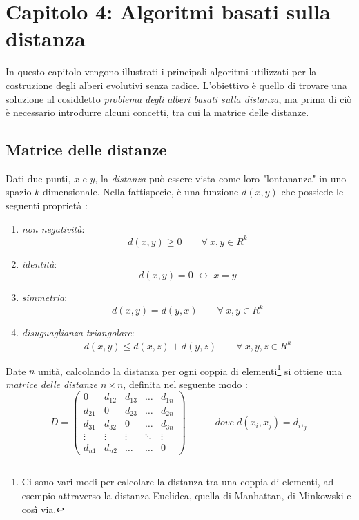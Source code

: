 \chapter{Capitolo 4: Algoritmi basati sulla distanza}
In questo capitolo vengono illustrati i principali algoritmi utilizzati per la costruzione degli alberi evolutivi senza radice. L'obiettivo è quello di trovare una soluzione al cosiddetto \textit{problema degli alberi basati sulla distanza}, ma prima di ciò è necessario introdurre alcuni concetti, tra cui la matrice delle distanze.

\section{Matrice delle distanze}
Dati due punti, $x$ e $y$, la \textit{distanza} può essere vista come loro "lontananza" in uno spazio $k$-dimensionale. Nella fattispecie, è una funzione $d(x,y)$ che possiede le seguenti proprietà \cite{molaCagliari}:
\begin{enumerate}
	\item \textit{non negatività}:
	\[d(x,y)\geq 0\hspace{2em} \forall \: x,y\in R^k\]
	\item \textit{identità}:
	\[d(x,y)=0 \; \leftrightarrow \; x=y\]
	\item \textit{simmetria}:
	\[d(x,y)=d(y,x)\hspace{2em} \forall \: x,y\in R^k\]
	\item \textit{disuguaglianza triangolare}:
	\[d(x,y)\leq d(x,z)+d(y,z)\hspace{2em} \forall \: x,y,z\in R^k\]
\end{enumerate}
Date $n$ unità, calcolando la distanza per ogni coppia di elementi\footnote{Ci sono vari modi per calcolare la distanza tra una coppia di elementi, ad esempio attraverso la distanza Euclidea, quella di Manhattan, di Minkowski e così via.} si ottiene una \textit{matrice delle distanze $n \times n$}, definita nel seguente modo \cite{ingrassiaStatistica}:
\[
D = \begin{pmatrix}
0 & d_{12} & d_{13} & \ldots & d_{1n} \\ 
d_{21} & 0 & d_{23} & \ldots & d_{2n} \\ 
d_{31} & d_{32} & 0 & \ldots & d_{3n} \\ 
\vdots & \vdots & \vdots & \ddots & \vdots \\ 
d_{n1} & d_{n2} & \ldots & \ldots & 0
\end{pmatrix}
\hspace{3em}dove\;d(x_i,x_j)=d_i,_j
\]
